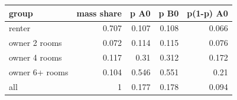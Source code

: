 \begin{tabular}{lrrrr}
\toprule
group & mass share & p A0 & p B0 & p(1-p) A0 \\
\midrule
renter & 0.707 & 0.107 & 0.108 & 0.066 \\
owner 2 rooms & 0.072 & 0.114 & 0.115 & 0.076 \\
owner 4 rooms & 0.117 & 0.31 & 0.312 & 0.172 \\
owner 6+ rooms & 0.104 & 0.546 & 0.551 & 0.21 \\
all & 1 & 0.177 & 0.178 & 0.094 \\
\bottomrule
\end{tabular}
